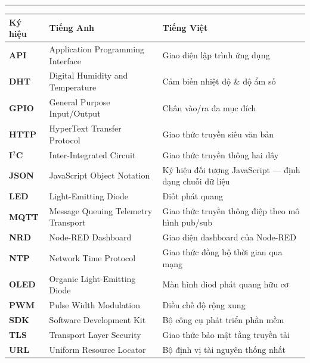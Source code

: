 \documentclass[13pt,a4paper]{article}
\begin{document}
\newpage
\thispagestyle{empty}
\vspace*{0.4cm}
\begin{center}
    \fontsize{19}{24}\selectfont\bfseries{}\par
    \vspace{0.25ex}
    \rule{0.45\textwidth}{1.8pt}
\end{center}
\vspace{0.65cm}

{}

\noindent
\begingroup
\renewcommand{\arraystretch}{1.18}%
\begin{tabularx}{\textwidth}{@{}
    >{\centering\arraybackslash}m{2.35cm}
    >{\raggedright\arraybackslash}X
    >{\raggedright\arraybackslash}X
@{}}
    \toprule
    \textbf{Ký hiệu} & \textbf{Tiếng Anh} & \textbf{Tiếng Việt} \\
    \midrule
    \textbf{API}   & Application Programming Interface   & Giao diện lập trình ứng dụng \\
    \textbf{DHT}   & Digital Humidity and Temperature   & Cảm biến nhiệt độ \& độ ẩm số \\
    \textbf{GPIO}  & General Purpose Input/Output       & Chân vào/ra đa mục đích \\
    \textbf{HTTP}  & HyperText Transfer Protocol       & Giao thức truyền siêu văn bản \\
    \textbf{I$^2$C} & Inter-Integrated Circuit          & Giao thức truyền thông hai dây \\
    \textbf{JSON}  & JavaScript Object Notation        & Ký hiệu đối tượng JavaScript --- định dạng chuỗi dữ liệu \\
    \textbf{LED}   & Light-Emitting Diode               & Điốt phát quang \\
    \textbf{MQTT}  & Message Queuing Telemetry Transport & Giao thức truyền thông điệp theo mô hình pub/sub \\
    \textbf{NRD}   & Node-RED Dashboard                 & Giao diện dashboard của Node-RED \\
    \textbf{NTP}   & Network Time Protocol               & Giao thức đồng bộ thời gian qua mạng \\
    \textbf{OLED}  & Organic Light-Emitting Diode        & Màn hình diod phát quang hữu cơ \\
    \textbf{PWM}   & Pulse Width Modulation              & Điều chế độ rộng xung \\
    \textbf{SDK}   & Software Development Kit            & Bộ công cụ phát triển phần mềm \\
    \textbf{TLS}   & Transport Layer Security            & Giao thức bảo mật tầng truyền tải \\
    \textbf{URL}   & Uniform Resource Locator           & Bộ định vị tài nguyên thống nhất \\
    \bottomrule
\end{tabularx}
\endgroup
\end{document}
